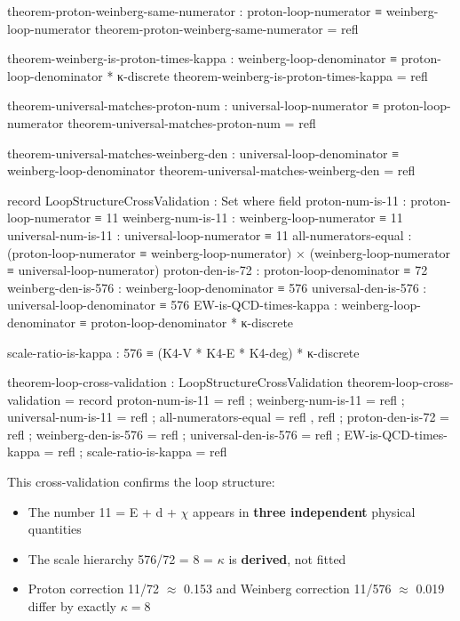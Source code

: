 \documentclass[11pt,a4paper]{book}
\begin{document}
\begin{code}
theorem-proton-weinberg-same-numerator : proton-loop-numerator ≡ weinberg-loop-numerator
theorem-proton-weinberg-same-numerator = refl

theorem-weinberg-is-proton-times-kappa : weinberg-loop-denominator ≡ proton-loop-denominator * κ-discrete
theorem-weinberg-is-proton-times-kappa = refl

theorem-universal-matches-proton-num : universal-loop-numerator ≡ proton-loop-numerator
theorem-universal-matches-proton-num = refl

theorem-universal-matches-weinberg-den : universal-loop-denominator ≡ weinberg-loop-denominator
theorem-universal-matches-weinberg-den = refl

record LoopStructureCrossValidation : Set where
  field
    proton-num-is-11   : proton-loop-numerator ≡ 11
    weinberg-num-is-11 : weinberg-loop-numerator ≡ 11
    universal-num-is-11 : universal-loop-numerator ≡ 11
    all-numerators-equal : (proton-loop-numerator ≡ weinberg-loop-numerator) × 
                           (weinberg-loop-numerator ≡ universal-loop-numerator)
    proton-den-is-72   : proton-loop-denominator ≡ 72
    weinberg-den-is-576 : weinberg-loop-denominator ≡ 576
    universal-den-is-576 : universal-loop-denominator ≡ 576
    EW-is-QCD-times-kappa : weinberg-loop-denominator ≡ proton-loop-denominator * κ-discrete
    
    scale-ratio-is-kappa : 576 ≡ (K4-V * K4-E * K4-deg) * κ-discrete

theorem-loop-cross-validation : LoopStructureCrossValidation
theorem-loop-cross-validation = record
  { proton-num-is-11 = refl
  ; weinberg-num-is-11 = refl
  ; universal-num-is-11 = refl
  ; all-numerators-equal = refl , refl
  ; proton-den-is-72 = refl
  ; weinberg-den-is-576 = refl
  ; universal-den-is-576 = refl
  ; EW-is-QCD-times-kappa = refl
  ; scale-ratio-is-kappa = refl
  }
\end{code}

This cross-validation confirms the loop structure:
\begin{itemize}
\item The number 11 = E + d + $\chi$ appears in \textbf{three independent} physical quantities
\item The scale hierarchy 576/72 = 8 = $\kappa$ is \textbf{derived}, not fitted
\item Proton correction 11/72 $\approx$ 0.153 and Weinberg correction 11/576 $\approx$ 0.019 differ by exactly $\kappa = 8$
\end{itemize}
\end{document}

